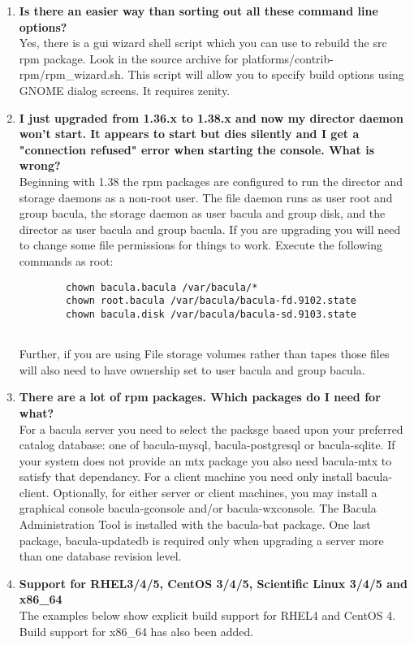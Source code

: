 \begin{enumerate}
\item 
   \label{faq7}
   {\bf Is there an easier way than sorting out all these command line options?}
   \\
   Yes, there is a gui wizard shell script which you can use to rebuild the
   src rpm package.  Look in the source archive for
   platforms/contrib-rpm/rpm\_wizard.sh.  This script will allow you to
   specify build options using GNOME dialog screens.  It requires zenity.

\item 
   \label{faq8}
   {\bf I just upgraded from 1.36.x to 1.38.x and now my director daemon
won't start.  It appears to start but dies silently and I get a "connection
refused" error when starting the console.  What is wrong?} \\
   Beginning with 1.38 the rpm packages are configured to run the director
   and storage daemons as a non-root user.  The file daemon runs as user
   root and group bacula, the storage daemon as user bacula and group disk,
   and the director as user bacula and group bacula.  If you are upgrading
   you will need to change some file permissions for things to work.
   Execute the following commands as root:

\footnotesize
\begin{verbatim}
        chown bacula.bacula /var/bacula/*
        chown root.bacula /var/bacula/bacula-fd.9102.state
        chown bacula.disk /var/bacula/bacula-sd.9103.state
        
\end{verbatim}
\normalsize

Further, if you are using File storage volumes rather than tapes those
files will also need to have ownership set to user bacula and group bacula.

\item 
   \label{faq9}
   {\bf There are a lot of rpm packages.  Which packages do I need for
what?} \\
For a bacula server you need to select the packsge based upon your
preferred catalog database: one of bacula-mysql, bacula-postgresql or
bacula-sqlite.  If your system does not provide an mtx package you also
need bacula-mtx to satisfy that dependancy.  For a client machine you need
only install bacula-client.  Optionally, for either server or client
machines, you may install a graphical console bacula-gconsole and/or
bacula-wxconsole. The Bacula Administration Tool is installed with the 
bacula-bat package.  One last package, bacula-updatedb is required only when
upgrading a server more than one database revision level.



\item {\bf Support for RHEL3/4/5, CentOS 3/4/5, Scientific Linux 3/4/5 and x86\_64}
   \\
   The examples below show
   explicit build support for RHEL4 and CentOS 4. Build support 
   for x86\_64 has also been added. 
\end{enumerate}

